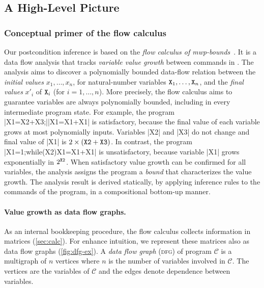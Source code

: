 \subsection{A High-Level Picture}
\label{sec:prelim}

\subsubsection{Conceptual primer of the flow calculus}
\label{subsec:flow-calc-intro}

Our postcondition inference is based on the \emph{flow calculus of mwp-bounds}~\cite{jones2009,aubert20222}.
It is a data flow analysis that tracks \emph{variable value growth} between commands in .
The analysis aims to discover a polynomially bounded data-flow relation between the
\emph{initial values} \(x_1,\ldots,x_n\), for natural-number variables \(\prm{X}_1,\ldots,\prm{X}_n\), and the
\emph{final values} \(x'_i\) of \(\prm{X}_i\) (for \(i=1,\ldots,n\)).
More precisely, the flow calculus aims to guarantee variables are always polynomially bounded, including in every intermediate program state.
For example, the program \pr|X1=X2+X3;|\pr|X1=X1+X1| is satisfactory, because the final value of each variable grows at most polynomially \wrt inputs.
Variables \pr|X2| and \pr|X3| do not change and final value of \pr|X1| is \(2 \times (\prm{X2} + \prm{X3})\).
In contrast, the program \pr|X1=1;while(X2){X1=X1+X1}| is unsatisfactory, because variable \pr|X1| grows exponentially in \(2^{\prm{X2}}\).
When satisfactory value growth can be confirmed for all variables, the analysis assigns the program a \emph{bound} that characterizes the value growth.
The analysis result is derived statically, by applying inference rules to the commands of the program, in a compositional bottom-up manner.

\paragraph*{Value growth as data flow graphs.}
As an internal bookkeeping procedure, the flow calculus collects information in matrices (\autoref{sec:calc}).
For enhance intuition, we represent these matrices also as data flow graphs (\autoref{fig:dfg-ex}).
A \emph{data flow graph} (\textsc{dfg}) of program \(\mathcal{C}\) is a multigraph of \(n\) vertices where \(n\) is the number of variables
involved in \(\mathcal{C}\).
The vertices are the variables of \(\mathcal{C}\) and the edges denote {dependence} between variables.

